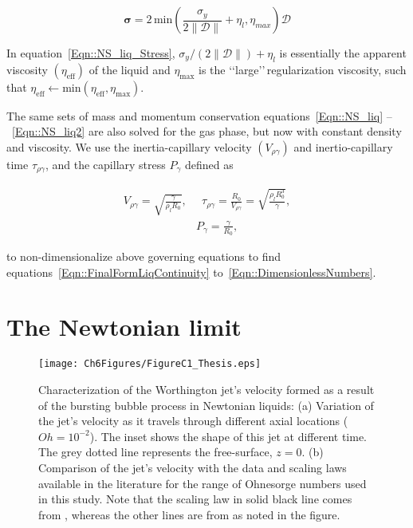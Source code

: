 \begin{subappendices}
\begin{equation}\label{Eqn::NS_liq_Stress}
	\boldsymbol{\sigma} = 2\,\mathrm{min}\left(\frac{\sigma_y}{2\|\boldsymbol{\mathcal{D}}\|} + \eta_l , \eta_{max}\right) \boldsymbol{\mathcal{D}}
\end{equation}

In equation~\eqref{Eqn::NS_liq_Stress}, $\sigma_y/\left(2\|\boldsymbol{\mathcal{D}}\|\right) + \eta_l$ is essentially the apparent viscosity $\left(\eta_{\text{eff}}\right)$ of the liquid and $\eta_{\text{max}}$ is the \lq\lq large\rq\rq\,regularization viscosity, such that $\eta_{\text{eff}} \gets \text{min}\left(\eta_{\text{eff}}, \eta_{\text{max}}\right)$. 

The same sets of mass and momentum conservation equations~\eqref{Eqn::NS_liq} --~\eqref{Eqn::NS_liq2} are also solved for the gas phase, but now with constant density and viscosity. We use the inertia-capillary velocity $\left(V_{\rho\gamma}\right)$ and inertio-capillary time $\tau_{\rho\gamma}$, and the capillary stress $P_{\gamma}$ defined as

\begin{align}\label{Eqn::Scales1}
	V_{\rho\gamma} = \sqrt{\frac{\gamma}{\rho_lR_0}},&\,\,\,\tau_{\rho\gamma} = \frac{R_0}{V_{\rho\gamma}} = \sqrt{\frac{\rho_lR_0^3}{\gamma}},\\
	\label{Eqn::Scales2}
	&P_{\gamma} = \frac{\gamma}{R_0},
\end{align}

\noindent to non-dimensionalize above governing equations to find equations~\eqref{Eqn::FinalFormLiqContinuity} to~\eqref{Eqn::DimensionlessNumbers}.

\section{The Newtonian limit}\label{App::Validation}

\begin{sidewaysfigure}
	\centering
	\texttt{[image: Ch6Figures/FigureC1\_Thesis.eps]}
	\caption{Characterization of the Worthington jet's velocity formed as a result of the bursting bubble process in Newtonian liquids: (a) Variation of the jet's velocity as it travels through different axial locations ($Oh = 10^{-2}$). The inset shows the shape of this jet at different time. The grey dotted line represents the free-surface, $z = 0$. (b) Comparison of the jet's velocity with the data and scaling laws available in the literature for the range of Ohnesorge numbers used in this study. Note that the scaling law in solid black line comes from \citet{deike2018dynamics}, whereas the other lines are from \citet{gordillo2019capillary} as noted in the figure. }
	\label{fig:NewtonianJetVelocity}
\end{sidewaysfigure}


\end{subappendices}
